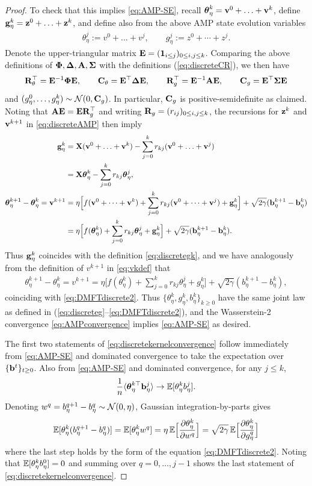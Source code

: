 \begin{proof}
To check that this implies \eqref{eq:AMP-SE},
recall $\boldsymbol{\theta}_\eta^k=\mathbf{v}^0+\ldots+\mathbf{v}^k$, define
$\mathbf{g}_\eta^k=\mathbf{z}^0+\ldots+\mathbf{z}^k$, and define also
from the above AMP state evolution variables
\begin{align*}
\theta^{j}_\eta:=v^0+\ldots+v^j,
\qquad g^{j}_\eta:=z^0+\cdots+z^j.
\end{align*}
Denote the upper-triangular
matrix $\mathbf{E}=(\mathbf{1}_{i\leq j})_{0\leq i,j\leq k}$. Comparing the above definitions
of $\boldsymbol{\Phi},\boldsymbol{\Delta},\mathbf{A},\boldsymbol{\Sigma}$ with the
definitions (\ref{eq:discreteCR}), we then have
\[\mathbf{R}_\theta^\top=\mathbf{E}^{-1}\boldsymbol{\Phi}\mathbf{E},
\qquad \mathbf{C}_\theta=\mathbf{E}^\top\boldsymbol{\Delta}\mathbf{E},
\qquad \mathbf{R}_g^\top=\mathbf{E}^{-1}\mathbf{A}\mathbf{E},
\qquad \mathbf{C}_g=\mathbf{E}^\top\boldsymbol{\Sigma}\mathbf{E}\]
and $(g_\eta^0,\ldots,g_\eta^k) \sim \mathcal{N}(0,\mathbf{C}_g)$. In particular, $\mathbf{C}_g$ is
positive-semidefinite as claimed. Noting that $\mathbf{A}\mathbf{E}=\mathbf{E}\mathbf{R}_g^\top$
and writing $\mathbf{R}_g=(r_{ij})_{0 \leq i,j \leq k}$,
the recursions for $\mathbf{z}^k$ and $\mathbf{v}^{k+1}$ in \eqref{eq:discreteAMP} then imply
\begin{align*}
\mathbf{g}_\eta^k&=\mathbf{X}(\mathbf{v}^0+\ldots+\mathbf{v}^k)-\sum_{j=0}^k r_{kj}(\mathbf{v}^0+\ldots+\mathbf{v}^j)\\
&=\mathbf{X}\boldsymbol{\theta}_\eta^k-\sum_{j=0}^k r_{kj}\boldsymbol{\theta}_\eta^j,\\
\boldsymbol{\theta}_\eta^{k+1}-\boldsymbol{\theta}_\eta^k
=\mathbf{v}^{k+1}&=\eta\Big[
f(\mathbf{v}^0+\cdots+\mathbf{v}^k)
+\sum_{j=0}^k r_{kj}(\mathbf{v}^0+\cdots+\mathbf{v}^j)
+\mathbf{g}_\eta^k \Big] + \sqrt{2\gamma}(\mathbf{b}_\eta^{k+1}-\mathbf{b}_\eta^k)\\
&=\eta\Big[f(\boldsymbol{\theta}_\eta^k)+\sum_{j=0}^k r_{kj}\boldsymbol{\theta}_\eta^j+\mathbf{g}_\eta^k
\Big] + \sqrt{2\gamma}(\mathbf{b}_\eta^{k+1}-\mathbf{b}_\eta^k).
\end{align*}
Thus $\mathbf{g}_\eta^k$ coincides with the definition \eqref{eq:discretegk}, and we
have analogously from the definition of $v^{k+1}$ in \eqref{eq:vkdef} that
\begin{align*}
\theta_\eta^{k+1}-\theta_\eta^k
=v^{k+1}=\eta\Bigg[f(\theta_\eta^k)+\sum_{j=0}^k r_{kj}\theta_\eta^j
+g_\eta^k\Bigg] + \sqrt{2\gamma}(b_\eta^{k+1}-b_\eta^k),
\end{align*}
coinciding with \eqref{eq:DMFTdiscrete2}. Thus
$\{\theta_\eta^k,g_\eta^k,b_\eta^k\}_{k \geq 0}$ have the same joint law as defined in
(\ref{eq:discreteg}--\ref{eq:DMFTdiscrete2}), and the Wasserstein-2
convergence \eqref{eq:AMPconvergence} implies \eqref{eq:AMP-SE} as desired.

The first two statements of \eqref{eq:discretekernelconvergence} follow
immediately from \eqref{eq:AMP-SE} and dominated convergence to take
the expectation over $\{\mathbf{b}^t\}_{t \geq 0}$. Also from \eqref{eq:AMP-SE} and
dominated convergence, for any $j \leq k$,
\[
\frac{1}{n}\langle \boldsymbol{\theta}_\eta^{k\top}\mathbf{b}_\eta^j \rangle
\to \mathbb{E} [\theta^k_\eta b^j_\eta].\]
Denoting $w^q=b_\eta^{q+1}-b_\eta^q \sim \mathcal{N}(0,\eta)$,
Gaussian integration-by-parts gives
\[
\mathbb{E} [\theta^k_\eta (b^{q+1}_\eta-b^q_\eta)] = \mathbb{E} [\theta^k_\eta w^q] = \eta\,\mathbb{E}
\Big[\frac{\partial \theta^k_\eta}{\partial w^q}\Big]
=\sqrt{2\gamma}\,\mathbb{E}\Big[\frac{\partial \theta^k_\eta}{\partial g^q_\eta}\Big]\]
where the last step holds by the form of the equation \eqref{eq:DMFTdiscrete2}.
Noting that $\mathbb{E}[\theta_\eta^k b_\eta^0]=0$ and summing over $q=0,\ldots,j-1$
shows the last statement of \eqref{eq:discretekernelconvergence}.
\end{proof}

